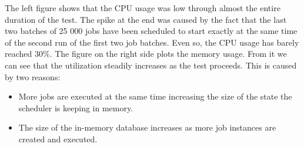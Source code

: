 \documentclass[11pt,a4paper,twoside]{report}
\begin{document}
The left figure shows that the CPU usage was low through almost the entire duration of the test. The spike at the end was caused by the fact that the last two batches of 25 000 jobs have been scheduled to start exactly at the same time of the second run of the first two job batches. Even so, the CPU usage has barely reached 30\%. The figure on the right side plots the memory usage. From it we can see that the utilization steadily increases as the test proceeds. This is caused by two reasons:

\begin{itemize}
\item{More jobs are executed at the same time increasing the size of the state the scheduler is keeping in memory.}
\item{The size of the in-memory database increases as more job instances are created and executed.}
\end{itemize}
\end{document}
